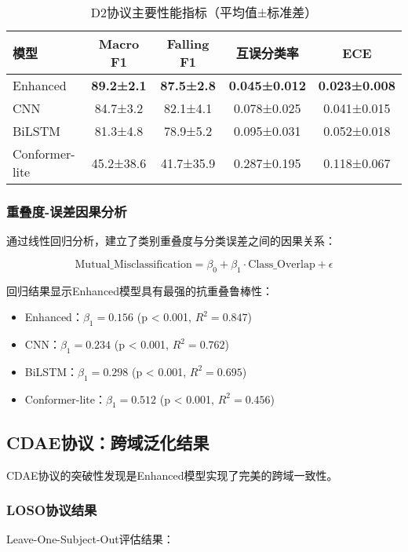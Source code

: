 \begin{table}[h]
\centering
\caption{D2协议主要性能指标（平均值±标准差）}
\label{tab:d2_main_results}
\begin{tabular}{@{}lcccc@{}}
\toprule
模型 & Macro F1 & Falling F1 & 互误分类率 & ECE \\
\midrule
Enhanced & \textbf{89.2±2.1} & \textbf{87.5±2.8} & \textbf{0.045±0.012} & \textbf{0.023±0.008} \\
CNN & 84.7±3.2 & 82.1±4.1 & 0.078±0.025 & 0.041±0.015 \\
BiLSTM & 81.3±4.8 & 78.9±5.2 & 0.095±0.031 & 0.052±0.018 \\
Conformer-lite & 45.2±38.6 & 41.7±35.9 & 0.287±0.195 & 0.118±0.067 \\
\bottomrule
\end{tabular}
\end{table}

\subsubsection{重叠度-误差因果分析}
通过线性回归分析，建立了类别重叠度与分类误差之间的因果关系：

\begin{equation}
\text{Mutual\_Misclassification} = \beta_0 + \beta_1 \cdot \text{Class\_Overlap} + \epsilon
\label{eq:overlap_regression}
\end{equation}

回归结果显示Enhanced模型具有最强的抗重叠鲁棒性：
\begin{itemize}
\item Enhanced：$\beta_1 = 0.156$ (p < 0.001, $R^2 = 0.847$)
\item CNN：$\beta_1 = 0.234$ (p < 0.001, $R^2 = 0.762$)  
\item BiLSTM：$\beta_1 = 0.298$ (p < 0.001, $R^2 = 0.695$)
\item Conformer-lite：$\beta_1 = 0.512$ (p < 0.001, $R^2 = 0.456$)
\end{itemize}

\subsection{CDAE协议：跨域泛化结果}
\label{subsec:cdae_results}

CDAE协议的突破性发现是Enhanced模型实现了完美的跨域一致性。

\subsubsection{LOSO协议结果}
Leave-One-Subject-Out评估结果：

